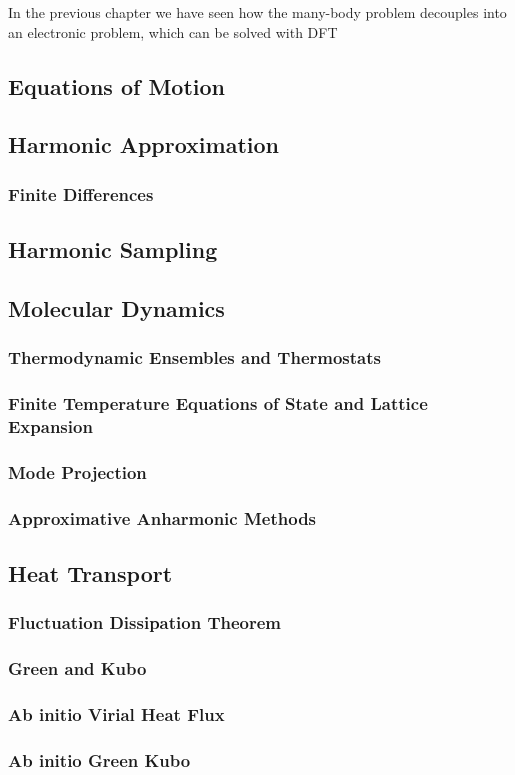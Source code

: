 In the previous chapter we have seen how the many-body problem decouples into an electronic problem, which can be solved with DFT

\subsection{Equations of Motion}
\subsection{Harmonic Approximation}
\subsubsection{Finite Differences}
\subsection{Harmonic Sampling}

\subsection{Molecular Dynamics}
\subsubsection{Thermodynamic Ensembles and Thermostats}
\subsubsection{Finite Temperature Equations of State and Lattice Expansion}
\subsubsection{Mode Projection}
\subsubsection{Approximative Anharmonic Methods}

\subsection{Heat Transport}
\subsubsection{Fluctuation Dissipation Theorem}
\subsubsection{Green and Kubo}
\subsubsection{Ab initio Virial Heat Flux}
\subsubsection{Ab initio Green Kubo}